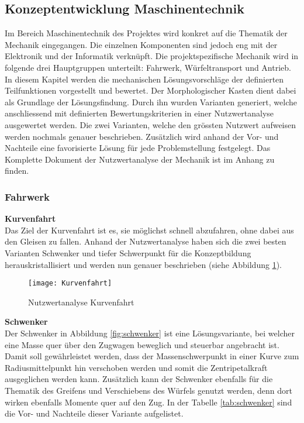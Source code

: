 \documentclass[../../main.tex]{subfiles}
\begin{document}
    \subsection{Konzeptentwicklung Maschinentechnik}
    Im Bereich Maschinentechnik des Projektes wird konkret auf die Thematik der Mechanik eingegangen. Die einzelnen Komponenten sind jedoch eng mit der Elektronik und der Informatik verknüpft. Die projektspezifische Mechanik wird in folgende drei Hauptgruppen unterteilt: Fahrwerk, Würfeltransport und Antrieb. In diesem Kapitel werden die mechanischen Lösungsvorschläge der definierten Teilfunktionen vorgestellt und bewertet. Der Morphologischer Kasten dient dabei als Grundlage der Lösungsfindung. Durch ihn wurden Varianten generiert, welche anschliessend mit definierten Bewertungskriterien in einer Nutzwertanalyse ausgewertet werden. Die zwei Varianten, welche den grössten Nutzwert aufweisen werden nochmals genauer beschrieben. Zusätzlich wird anhand der Vor- und Nachteile eine favorisierte Lösung für jede Problemstellung festgelegt. Das Komplette Dokument der Nutzwertanalyse der Mechanik ist im Anhang zu finden.

    \subsubsection{Fahrwerk}
    \textbf{Kurvenfahrt}\\
    Das Ziel der Kurvenfahrt ist es, sie möglichst schnell abzufahren, ohne dabei aus den Gleisen zu fallen. Anhand der Nutzwertanalyse haben sich die zwei besten Varianten Schwenker und tiefer Schwerpunkt für die Konzeptbildung herauskristallisiert und werden nun genauer beschrieben (siehe Abbildung \ref{fig:kurvenfahrt}).

    \begin{figure}[H] %
        \centering
        \texttt{[image: Kurvenfahrt]}
        \caption{Nutzwertanalyse Kurvenfahrt}
        \label{fig:kurvenfahrt}
    \end{figure}
    
    \textbf{Schwenker}\\
    Der Schwenker in Abbildung \ref{fig:schwenker} ist eine Lösungsvariante, bei welcher eine Masse quer über den Zugwagen beweglich und steuerbar angebracht ist. Damit soll gewährleistet werden, dass der Massenschwerpunkt in einer Kurve zum Radiusmittelpunkt hin verschoben werden und somit die Zentripetalkraft ausgeglichen werden kann. Zusätzlich kann der Schwenker ebenfalls für die Thematik des Greifens und Verschiebens des Würfels genutzt werden, denn dort wirken ebenfalls Momente quer auf den Zug. In der Tabelle \ref{tab:schwenker} sind die Vor- und Nachteile dieser Variante aufgelistet.
    
\end{document}
